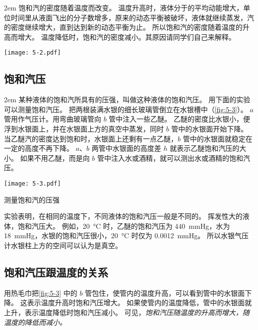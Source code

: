 \medskip\noindent
\begin{minipage}{0.65\linewidth}\parindent2em
  饱和汽的密度随着温度而改变。
  温度升高时，液体分于的平均动能增大，单位时间里从液面飞出的分子数增多，原来的动态平衡被破坏，液体就继续蒸发，汽的密度继续增大，直到达到新的动态平衡为止。
  所以饱和汽的密度随着温度的升高而增大。
  温度降低时，饱和汽的密度减小。其原因请同学们自己来解释。
\end{minipage}\hfill
\begin{minipage}{0.3\linewidth}\centering
  \begin{figurehere}
    \texttt{[image: 5-2.pdf]}
    \caption{}\label{fig:5-2}
  \end{figurehere}
\end{minipage}

\subsection{饱和汽压} 
\medskip\noindent
\begin{minipage}{0.65\linewidth}\parindent2em
某种液体的饱和汽所具有的压强，叫做这种液体的饱和汽压。
用下面的实验可以测量饱和汽压。
把两根装满水银的细长玻璃管倒立在水银槽中（\cref{fig:5-3}）。
$a$ 管用作气压计。用弯曲玻璃管向 $b$ 管中注入一些乙醚。
乙醚的密度比水银小，便浮到水银面上，并在水银面上方的真空中蒸发，同时 $b$ 管中的水银面开始下降。
当乙醚汽的密度达到饱和时，水银面上还剩有一点乙醚，$b$ 管中的水银面就稳定在一定的高度不再下降。
$a$、$b$ 两管中水银面的高度差 $h$ 就表示乙醚饱和汽压的大小。
如果不用乙醚，而是向 $b$ 管中注入水或酒精，就可以测出水或酒精的饱和汽压。
\end{minipage}\hfill
\begin{minipage}{0.3\linewidth}\centering
\begin{figurehere}
  \texttt{[image: 5-3.pdf]}
  \caption{测量饱和汽的压强}\label{fig:5-3}
\end{figurehere}
\end{minipage}

\medskip
实验表明，在相同的温度下，不同液体的饱和汽压一般是不同的。
挥发性大的液体，饱和汽压大。
例如，\qty{20}{\celsius} 时，乙醚的饱和汽压为 \qty{440}{mmHg}，水为 \qty{18}{mmHg}，水银的饱和汽压很小，\qty{20}{\celsius} 时仅为 \qty{0.0012}{mmHg}。
所以水银气压计水银柱上方的空间可以认为是真空。

\subsection{饱和汽压跟温度的关系} 
用热毛巾把\cref{fig:5-3} 中的 $b$ 管包住，使管内的温度升高，可以看到管中的水银面下降。
这表示温度升高时饱和汽压增大。
如果使管内的温度降低，管中的水银面就上升，表示温度降低时饱和汽压减小。
可见，\emph{饱和汽压随温度的升高而增大，随温度的降低而减小。}

